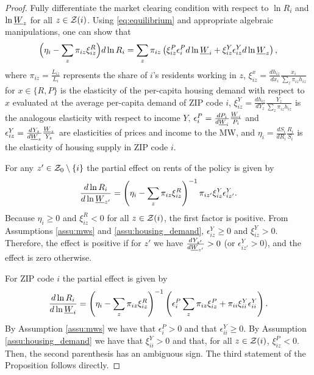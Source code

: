 \begin{proof}
    Fully differentiate the market clearing condition with respect to $\ln R_i$ 
    and $\ln \underline{W}_z$ for all $z\in\mathcal{Z}(i)$.
    Using \eqref{eq:equilibrium} and appropriate algebraic manipulations, 
    one can show that
    \begin{equation}\label{eq:diff_equilibrium}
        \Big(\eta_i - \sum_z \pi_{iz} \xi^R_{iz} \Big) d \ln R_i
        = 
        \sum_z \pi_{iz} \left(\xi^P_{iz} \epsilon_{i}^P d \ln \underline{W}_i 
                            + \xi^Y_{iz} \epsilon_{iz}^Y d \ln \underline{W}_z \right) ,
    \end{equation}
    where
    $\pi_{iz} = \frac{L_{iz}}{L_i}$ represents the share of $i$'s residents 
    working in $z$,
    $\xi_{iz}^x = \frac{d h_{iz}}{d x_i} \frac{x_i}{\sum_z \pi_{iz} h_{iz}}$ for
    $x\in\{R,P\}$ is the elasticity of the per-capita housing demand with respect
    to $x$ evaluated at the average per-capita demand of ZIP code $i$,
    $\xi_{iz}^Y = \frac{d h_{iz}}{d Y_z} \frac{Y_z}{\sum_z \pi_{iz} h_{iz}}$ is
    the analogous elasticity with respect to income $Y$,
    $\epsilon_{i}^P = \frac{d P_i}{d \underline{W}_i} \frac{\underline{W}_i}{P_i}$ and 
    $\epsilon_{iz}^Y = \frac{d Y_z}{d \underline{W}_z} \frac{\underline{W}_z}{Y_z}$ are
    elasticities of prices and income to the MW, and
    $\eta_i = \frac{d S_i}{d R_i} \frac{R_i}{S_i}$ is the elasticity 
    of housing supply in ZIP code $i$.

    For any $z'\in\mathcal{Z}_0\setminus\{i\}$ the partial effect on rents of the policy
    is given by
    $$
    \frac{d\ln R_i}{d\ln\underline{W}_{z'}} 
      = \left(\eta_i - \sum_z \pi_{iz} \xi^R_{iz}\right)^{-1} 
              \pi_{iz'}\xi^Y_{iz}\epsilon_{iz'}^Y.
    $$
    Because $\eta_i\geq0$ and $\xi^R_{iz} < 0$ for all $z\in\mathcal{Z}(i)$, 
    the first factor is positive.
    From Assumptions \ref{assu:mws} and \ref{assu:housing_demand},
    $\epsilon_{iz}^Y\geq0$ and $\xi^Y_{iz}>0$.
    Therefore, the effect is positive if for $z'$ we have 
    $\frac{d Y_{z'}}{d \underline{W}_{z'}}>0$ (or $\epsilon_{iz'}^Y>0$), 
    and the effect is zero otherwise.

    For ZIP code $i$ the partial effect is given by
    $$
    \frac{d\ln R_i}{d\ln\underline{W}_{i}} 
      = \left(\eta_i - \sum_z \pi_{iz} \xi^R_{iz}\right)^{-1} 
        \left(\epsilon_{i}^P \sum_z \pi_{iz}\xi^P_{iz} 
             + \pi_{ii}\xi^Y_{ii}\epsilon_{ii}^Y \right) .
    $$
    By Assumption \ref{assu:mws} we have that $\epsilon_{i}^P>0$ and that 
    $\epsilon_{ii}^Y\geq0$.
    By Assumption \ref{assu:housing_demand} we have that $\xi^Y_{ii}>0$ and that, 
    for all $z\in\mathcal{Z}(i)$, $\xi^P_{iz}<0$.
    Then, the second parenthesis has an ambiguous sign.
    The third statement of the Proposition follows directly.
\end{proof}

